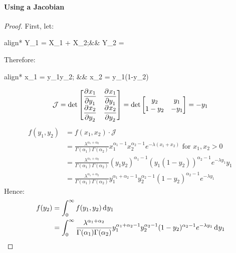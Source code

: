 \documentclass[12pt]{article}
\newcommand{\J}{\mathcal{J}}
\begin{document}
\paragraph{Using a Jacobian}
\begin{proof}
	First, let:
	\begin{empheq}[box=\widefbox]{align*}
		Y_1 = X_1 + X_2;&& Y_2 = 
	\end{empheq}
	Therefore:
	\begin{empheq}[box=\widefbox]{align*}
		x_1 = y_1y_2; && x_2 = y_1(1-y_2)
	\end{empheq}
	\begin{equation}
		\J = \det\begin{bmatrix}
			\pderiv{x_1}{y_1}	&	\pderiv{x_1}{y_1}\\[6pt]
			\pderiv{x_2}{y_2}	&	\pderiv{x_2}{y_2}
			\end{bmatrix} = \det\begin{bmatrix}
				y_2		&	y_1\\
				1-y_2	&	-y_1
			\end{bmatrix} = -y_1
	\end{equation}
	\begin{equation}
		\begin{split}
			f(y_1, y_2)	&=	f(x_1, x_2)\cdot\J\\
						&=	\frac{\lambda^{\alpha_1+\alpha_2}}{\Gamma(\alpha_1)\Gamma(\alpha_2)}x_1^{\alpha_1-1}x_2^{\alpha_2-1}e^{-\lambda(x_1+x_2)}\text{ for }x_1, x_2>0\\
						&=	\frac{\lambda^{\alpha_1+\alpha_2}}{\Gamma(\alpha_1)\Gamma(\alpha_2)}(y_1y_2)^{\alpha_1-1}(y_1(1-y_2))^{\alpha_2-1}e^{-\lambda y_1}y_1\\
						&=	\frac{\lambda^{\alpha_1+\alpha_2}}{\Gamma(\alpha_1)\Gamma(\alpha_2)}y_1^{\alpha_1+\alpha_2-1}y_2^{\alpha_2-1}(1-y_2)^{\alpha_2-1}e^{-\lambda y_1}
		\end{split}
	\end{equation}
	Hence:
	\begin{equation}
		\begin{split}
			f(y_2)	&=	\int^\infty_0 f(y_1, y_2)\mathop{}\!\mathrm{d^{}}y_1\\
					&=	\int^\infty_0 \frac{\lambda^{\alpha_1+\alpha_2}}{\Gamma(\alpha_1)\Gamma(\alpha_2)}y_1^{\alpha_1+\alpha_2-1}y_2^{\alpha_2-1}(1-y_2)^{\alpha_2-1}e^{-\lambda y_1}\mathop{}\!\mathrm{d^{}}y_1
		\end{split}
	\end{equation}
	\pagebreak


\end{proof}
\end{document}

